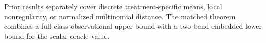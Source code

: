 Prior results separately cover discrete treatment-specific means, local nonregularity, or normalized multinomial distance.  The matched theorem combines a full-class observational upper bound with a two-band embedded lower bound for the scalar oracle value.